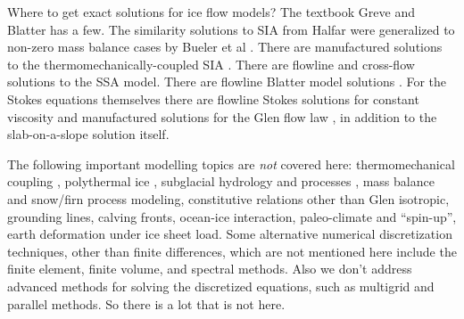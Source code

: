 \documentclass[titlepage,letterpaper,final,12pt]{scrartcl}
\begin{document}
Where to get exact solutions for ice flow models?  The textbook Greve and Blatter \cite{GreveBlatter2009} has a few.  The similarity solutions to SIA from Halfar \cite{Halfar81,Halfar83} were generalized to non-zero mass balance cases by Bueler et al \cite{BLKCB}.  There are manufactured solutions to the thermomechanically-coupled SIA  \cite{BBL}.  There are flowline \cite{vanderVeen83} and cross-flow \cite{SchoofStream} solutions to the SSA model.  There are flowline Blatter model solutions \cite{GlowinskiRappaz}.  For the Stokes equations themselves there are flowline Stokes solutions for constant viscosity \cite{BaliseRaymond1985} and manufactured solutions for the Glen flow law \cite{JouvetRappaz2011,SargentFastook2010}, in addition to the slab-on-a-slope solution itself.

The following important modelling topics are \emph{not} covered here: thermomechanical coupling \cite{BBL}, polythermal ice \cite{Greve,AschwandenBuelerKhroulevBlatter}, subglacial hydrology and processes \cite{Clarke05}, mass balance and snow/firn process modeling, constitutive relations other than Glen isotropic, grounding lines, calving fronts, ocean-ice interaction, paleo-climate and ``spin-up'', earth deformation under ice sheet load.  Some alternative numerical discretization techniques, other than finite differences, which are not mentioned here include the finite element, finite volume, and spectral methods.  Also we don't address advanced methods for solving the discretized equations, such as multigrid and parallel methods.  So there is a lot that is not here.

\footnotesize


\end{document}
